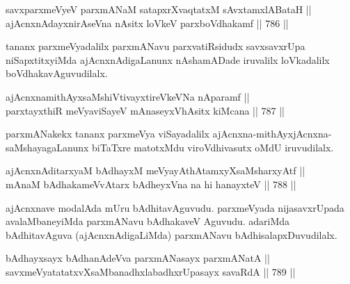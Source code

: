 
\begin{shl}
savxparxmeVyeV parxmANaM satapxrXvaqtatxM sAvxtamxlABataH || \\
ajAcnxnAdayxnirAseVna nAsitx loVkeV parxboVdhakamf \hfill || 786 ||  
\end{shl}

\begin{artha} 
tananx parxmeVyadalilx parxmANavu parxvatiRsidudx savxsavxrUpa niSapxtitxyiMda ajAcnxnAdigaLanunx nAshamADade iruvalilx loVkadalilx boVdhakavAguvudilalx.
\end{artha}


\begin{shl}
ajAcnxnamithAyxsaMshiVtivayxtireVkeVNa nAparamf || \\
parxtayxthiR meVyaviSayeV mAnaseyxVhAsitx kiMcana \hfill || 787 ||  
\end{shl}

\begin{artha} 
parxmANakekx tananx parxmeVya viSayadalilx ajAcnxna-mithAyxjAcnxna-saMshayagaLanunx biTaTxre matotxMdu viroVdhivasutx oMdU iruvudilalx.
\end{artha}


\begin{shl}
ajAcnxnAditarxyaM bAdhayxM meVyayAthAtamxyXsaMsharxyAtf || \\
mAnaM bAdhakameVvAtarx bAdheyxVna na hi hanayxteV \hfill || 788 ||  
\end{shl}

\begin{artha} 
ajAcnxnave modalAda mUru bAdhitavAguvudu. parxmeVyada nijasavxrUpada avalaMbaneyiMda parxmANavu bAdhakaveV Aguvudu. adariMda bAdhitavAguva (ajAcnxnAdigaLiMda) parxmANavu bAdhisalapxDuvudilalx.
\end{artha}





\begin{shl}
bAdhayxsayx bAdhanAdeVva parxmANasayx parxmANatA || \\
savxmeVyatatatxvXsaMbanadhxlabadhxrUpasayx savaRdA \hfill || 789 ||  
\end{shl}

